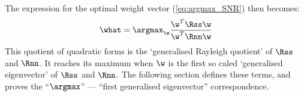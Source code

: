 
The expression for the optimal weight vector (\cref{eq:argmax_SNR}) then
becomes:
%
\begin{equation}
\label{eq:argmax_R}
\what = \argmax_{\w}
       \frac{\w^T \Rss \w}
            {\w^T \Rnn \w}
\end{equation}
%
This quotient of quadratic forms is the `generalised Rayleigh quotient' of
$\Rss$ and $\Rnn$. It reaches its maximum when $\w$ is the first so caled
`generalised eigenvector' of $\Rss$ and $\Rnn$. The following section defines
these terms, and proves the ``$\argmax$'' --- ``first generalised
eigenvector'' correspondence.
